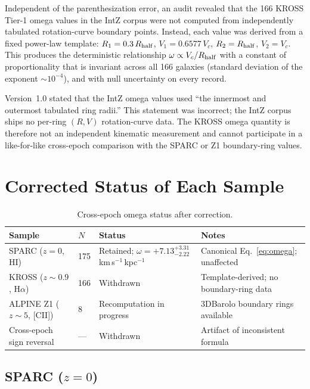 \documentclass[a4paper,12pt]{article}
\newcommand{\om}{\omega}
\newcommand{\omunit}{km\,s$^{-1}$\,kpc$^{-1}$}
\begin{document}
Independent of the parenthesization error, an audit revealed that the
166 KROSS Tier-1 omega values in the IntZ corpus were not computed
from independently tabulated rotation-curve boundary points. Instead,
each value was derived from a fixed power-law template:
$R_1 = 0.3\,R_{\rm half}$, $V_1 = 0.6577\,V_c$, $R_2 = R_{\rm half}$,
$V_2 = V_c$. This produces the deterministic relationship
$\om \propto V_c / R_{\rm half}$ with a constant of proportionality
that is invariant across all 166 galaxies (standard deviation of the
exponent $\sim 10^{-4}$), and with null uncertainty on every record.

Version~1.0 stated that the IntZ omega values used ``the innermost
and outermost tabulated ring radii.'' This statement was incorrect;
the IntZ corpus ships no per-ring $(R, V)$ rotation-curve data. The
KROSS omega quantity is therefore not an independent kinematic
measurement and cannot participate in a like-for-like cross-epoch
comparison with the SPARC or Z1 boundary-ring values.

\section{Corrected Status of Each Sample}
\label{sec:status}

\begin{table}[h]
\centering
\caption{Cross-epoch omega status after correction.}
\label{tab:status}
\begin{tabular}{llll}
\toprule
Sample & $N$ & Status & Notes \\
\midrule
SPARC ($z=0$, HI) & 175 &
  Retained; $\om = +7.13^{+3.31}_{-2.22}$\,\omunit &
  Canonical Eq.~\ref{eq:omega}; unaffected \\
KROSS ($z\sim0.9$, H$\alpha$) & 166 &
  Withdrawn &
  Template-derived; no boundary-ring data \\
ALPINE Z1 ($z\sim5$, [CII]) & 8 &
  Recomputation in progress &
  3DBarolo boundary rings available \\
\midrule
Cross-epoch sign reversal & --- &
  Withdrawn &
  Artifact of inconsistent formula \\
\bottomrule
\end{tabular}
\end{table}

\subsection{SPARC ($z=0$)}
\end{document}
